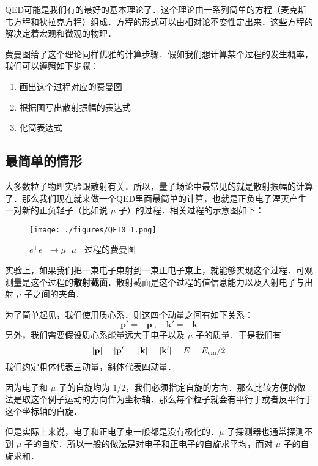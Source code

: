 

QED可能是我们有的最好的基本理论了．这个理论由一系列简单的方程（麦克斯韦方程和狄拉克方程）组成．方程的形式可以由相对论不变性定出来．这些方程的解决定着宏观和微观的物理．

费曼图给了这个理论同样优雅的计算步骤．假如我们想计算某个过程的发生概率，我们可以遵照如下步骤：

\begin{enumerate}
\item 画出这个过程对应的费曼图
\item 根据图写出散射振幅的表达式
\item 化简表达式
\end{enumerate}

\subsection{最简单的情形}
大多数粒子物理实验跟散射有关．所以，量子场论中最常见的就是散射振幅的计算了．那么我们现在就来做一个QED里面最简单的计算，也就是正负电子湮灭产生一对新的正负轻子（比如说 $\mu$ 子）的过程．相关过程的示意图如下：

\begin{figure}[ht]
\centering
\texttt{[image: ./figures/QFT0\_1.png]}
\caption{$e^+e^-\rightarrow\mu^+\mu^-$ 过程的费曼图} \label{QFT0_fig1}
\end{figure}

实验上，如果我们把一束电子束射到一束正电子束上，就能够实现这个过程．可观测量是这个过程的\textbf{散射截面}．散射截面是这个过程的值信息能力以及入射电子与出射 $\mu$ 子之间的夹角．

为了简单起见，我们使用质心系．则这四个动量之间有如下关系：
\begin{equation}
\mathbf p' = - \mathbf p~, \quad \mathbf k'=-\mathbf k
\end{equation}
另外，我们需要假设质心系能量远大于电子以及 $\mu$ 子的质量．于是我们有
\begin{equation}
|\mathbf p| = |\mathbf p'| = |\mathbf k| = |\mathbf k'| = E = E_{\rm cm}/2
\end{equation}
我们约定粗体代表三动量，斜体代表四动量．

因为电子和 $\mu$ 子的自旋均为 $1/2$，我们必须指定自旋的方向．那么比较方便的做法是取这个例子运动的方向作为坐标轴．那么每个粒子就会有平行于或者反平行于这个坐标轴的自旋．

但是实际上来说，电子和正电子束一般都是没有极化的．$\mu$ 子探测器也通常探测不到 $\mu$ 子的自旋．所以一般的做法是对电子和正电子的自旋求平均，而对 $\mu$ 子的自旋求和．

